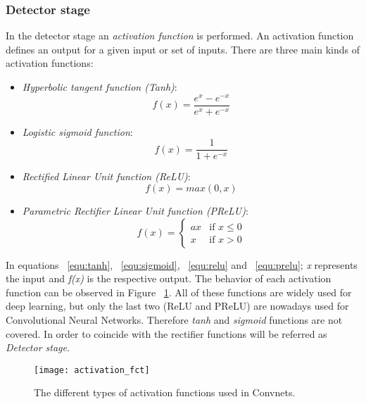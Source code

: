 \subsubsection{Detector stage}
\label{subsub:detector}
In the detector stage an \textit{activation function} is performed. An activation function defines an output for a given input or set of inputs. There are three main kinds of activation functions:
\begin{itemize}
 \item \textit{Hyperbolic tangent function (Tanh)}:
  \begin{equation}
   f(x) = \frac{e^{x}-e^{-x}}{e^{x}+e^{-x}}
   \label{equ:tanh}
  \end{equation}
 \item \textit{Logistic sigmoid function}:
   \begin{equation}
    f(x) = \frac{1}{ 1 + e^{-x}}
    \label{equ:sigmoid}
   \end{equation}   
 \item \textit{Rectified Linear Unit function (ReLU)}:
  \begin{equation}
   f(x) = max(0,x)
   \label{equ:relu}
  \end{equation}
 \item \textit{Parametric Rectifier Linear Unit function (PReLU)}:
  \begin{equation}
  f(x) =\begin{cases} ax & \mbox{if } x \leq 0 \\ x & \mbox{if } x > 0 \end{cases}     
  \label{equ:prelu}
  \end{equation}     
\end{itemize} 

In equations ~\ref{equ:tanh}, ~\ref{equ:sigmoid}, ~\ref{equ:relu} and ~\ref{equ:prelu}; \textit{x} represents the input and \textit{f(x)} is the respective output. The behavior of each activation function can be observed in Figure ~\ref{fig:actfct}. All of these functions are widely used for deep learning, but only the last two (ReLU and PReLU) are nowadays used for Convolutional Neural Networks. Therefore \textit{tanh} and \textit{sigmoid} functions are not covered. In order to coincide with \textcite{Bengio-et-al-2015-Book} the rectifier functions will be referred as  \textit{Detector stage}.

\begin{figure}
 \centering
 \texttt{[image: activation\_fct]}
 \caption{The different types of activation functions used in Convnets.}
 \label{fig:actfct}
\end{figure}

